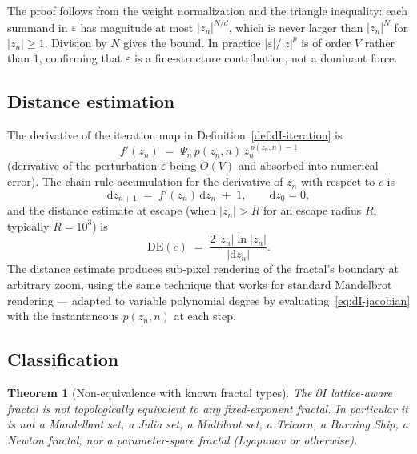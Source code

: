 \documentclass[11pt,a4paper]{article}
\newtheorem{theorem}{Theorem}[section]
\theoremstyle{definition}
\theoremstyle{remark}
\begin{document}
The proof follows from the weight normalization and the triangle inequality: each summand in $\varepsilon$ has magnitude at most $|z_{n}|^{N/d}$, which is never larger than $|z_{n}|^{N}$ for $|z_{n}|\geq 1$. Division by $N$ gives the bound. In practice $|\varepsilon|/|z|^{p}$ is of order $V$ rather than $1$, confirming that $\varepsilon$ is a fine-structure contribution, not a dominant force.

\subsection{Distance estimation}

The derivative of the iteration map in Definition~\ref{def:dI-iteration} is
\begin{equation}
f'(z_{n}) \;=\; \Psi_{n}\,p(z_{n},n)\,z_{n}^{\,p(z_{n},n)-1}
\label{eq:dI-jacobian}
\end{equation}
(derivative of the perturbation $\varepsilon$ being $O(V)$ and absorbed into numerical error). The chain-rule accumulation for the derivative of $z_{n}$ with respect to $c$ is
\begin{equation}
\mathrm{d}z_{n+1} \;=\; f'(z_{n})\,\mathrm{d}z_{n} \;+\; 1, \qquad \mathrm{d}z_{0}=0,
\end{equation}
and the distance estimate at escape (when $|z_{n}|>R$ for an escape radius $R$, typically $R=10^{3}$) is
\begin{equation}
\mathrm{DE}(c) \;=\; \frac{2\,|z_{n}|\ln|z_{n}|}{|\mathrm{d}z_{n}|}.
\label{eq:dI-DE}
\end{equation}
The distance estimate produces sub-pixel rendering of the fractal's boundary at arbitrary zoom, using the same technique that works for standard Mandelbrot rendering --- adapted to variable polynomial degree by evaluating~\eqref{eq:dI-jacobian} with the instantaneous $p(z_{n},n)$ at each step.

\subsection{Classification}

\begin{theorem}[Non-equivalence with known fractal types]\label{thm:dI-novel}
The $\partial I$ lattice-aware fractal is not topologically equivalent to any fixed-exponent fractal. In particular it is not a Mandelbrot set, a Julia set, a Multibrot set, a Tricorn, a Burning Ship, a Newton fractal, nor a parameter-space fractal (Lyapunov or otherwise).
\end{theorem}
\end{document}
